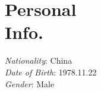 
\section{Personal\\Info.}

{\em Nationality}: China\\
{\em Date of Birth}: 1978.11.22\\
{\em Gender}: Male

